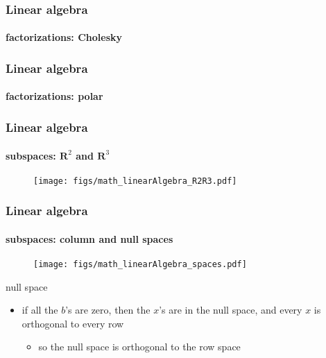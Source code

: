 \begin{frame}
\frametitle{Linear algebra}
\framesubtitle{factorizations: Cholesky}
\logoCSIPCPL\mypagenum\mypagenum
\end{frame}

\begin{frame}
\frametitle{Linear algebra}
\framesubtitle{factorizations: polar}
\logoCSIPCPL\mypagenum\mypagenum
\end{frame}



\begin{frame}
\frametitle{Linear algebra}
\framesubtitle{subspaces: $\mathbf{R}^2$ and $\mathbf{R}^3$}
\logoCSIPCPL\mypagenum\mypagenum
	\begin{figure}				
		\texttt{[image: figs/math\_linearAlgebra\_R2R3.pdf]}
	\end{figure}
\end{frame}



\begin{frame}
\frametitle{Linear algebra}
\framesubtitle{subspaces: column and null spaces}
\logoCSIPCPL\mypagenum\mypagenum
	\begin{figure}				
		\texttt{[image: figs/math\_linearAlgebra\_spaces.pdf]}
	\end{figure}

\vspace{0.1 in}
{\color{red} null space}
\begin{itemize}
	\item if all the $b$'s are zero, then the $x$'s are in the null space, and every $x$ is orthogonal to every row
		\begin{itemize}
			\item so the null space is orthogonal to the row space
		\end{itemize}
\end{itemize}
\end{frame}


